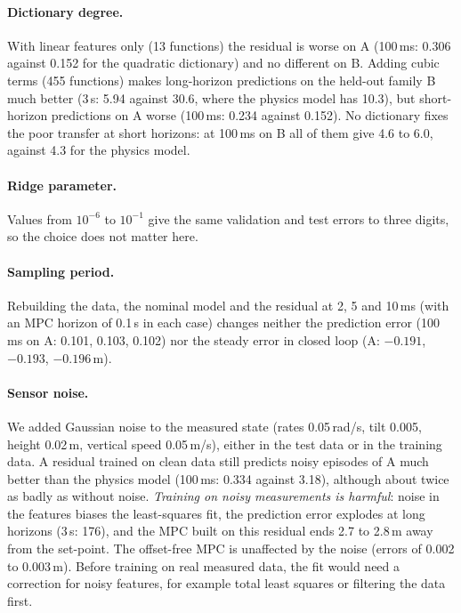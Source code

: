 \paragraph{Dictionary degree.} With linear features only (13 functions) the residual is worse on A (100\,ms: 0.306 against 0.152 for the quadratic dictionary) and no different on B. Adding cubic terms (455 functions) makes long-horizon predictions on the held-out family B much better (3\,s: 5.94 against 30.6, where the physics model has 10.3), but short-horizon predictions on A worse (100\,ms: 0.234 against 0.152). No dictionary fixes the poor transfer at short horizons: at 100\,ms on B all of them give 4.6 to 6.0, against 4.3 for the physics model.

\paragraph{Ridge parameter.} Values from $10^{-6}$ to $10^{-1}$ give the same validation and test errors to three digits, so the choice does not matter here.

\paragraph{Sampling period.} Rebuilding the data, the nominal model and the residual at 2, 5 and 10\,ms (with an MPC horizon of 0.1\,s in each case) changes neither the prediction error (100\,ms on A: 0.101, 0.103, 0.102) nor the steady error in closed loop (A: $-0.191$, $-0.193$, $-0.196$\,m).

\paragraph{Sensor noise.} We added Gaussian noise to the measured state (rates 0.05\,rad/s, tilt 0.005, height 0.02\,m, vertical speed 0.05\,m/s), either in the test data or in the training data. A residual trained on clean data still predicts noisy episodes of A much better than the physics model (100\,ms: 0.334 against 3.18), although about twice as badly as without noise. \emph{Training on noisy measurements is harmful}: noise in the features biases the least-squares fit, the prediction error explodes at long horizons (3\,s: 176), and the MPC built on this residual ends 2.7 to 2.8\,m away from the set-point. The offset-free MPC is unaffected by the noise (errors of 0.002 to 0.003\,m). Before training on real measured data, the fit would need a correction for noisy features, for example total least squares or filtering the data first.

